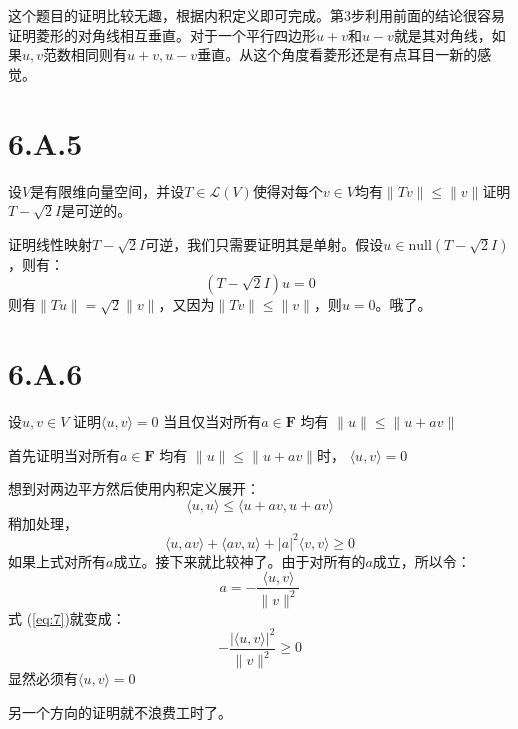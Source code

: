 \documentclass[10pt,a4paper,UTF8]{article}
\begin{document}
\begin{tikzanswer}
这个题目的证明比较无趣，根据内积定义即可完成。第3步利用前面的结论很容易证明菱形的对角线相互垂直。对于一个平行四边形\(u+v\)和\(u-v\)就是其对角线，如果\(u,v\)范数相同则有\(u+v,u-v\)垂直。从这个角度看菱形还是有点耳目一新的感觉。
\end{tikzanswer}

\section{6.A.5}
\label{sec:orga876859}


\begin{tikzproblem}
设\(V\)是有限维向量空间，并设\(T\in \mathcal{L}(V)\)使得对每个\(v\in V\)均有\(\| Tv \| \leq \| v \|\)证明\(T-\sqrt{2}I\)是可逆的。
\end{tikzproblem}

\begin{tikzanswer}
证明线性映射\(T-\sqrt{2}I\)可逆，我们只需要证明其是单射。假设\(u\in \mathrm{null}(T- \sqrt{2}I)\)，则有：
\begin{equation}
\label{eq:5}
(T-\sqrt{2}I)u = 0
\end{equation}
则有\(\| Tu \| = \sqrt{2} \| v \|\)，又因为\(\| Tv \| \leq \| v \|\)，则\(u=0\)。哦了。
\end{tikzanswer}
\section{6.A.6}
\label{sec:orgbba7a71}


\begin{tikzproblem}
设\(u,v\in V\) 证明\(\langle u,v \rangle = 0\) 当且仅当对所有\(a\in \mathbf{F}\) 均有 \(\| u \| \leq \| u + av \|\)
\end{tikzproblem}

\begin{tikzanswer}
首先证明当对所有\(a\in \mathbf{F}\) 均有 \(\| u \| \leq \| u + av \|\)时， \(\langle u,v \rangle = 0\)

想到对两边平方然后使用内积定义展开：
\begin{equation}
\label{eq:6}
\langle u,u \rangle  \leq \langle u+av,u+av \rangle
\end{equation}
稍加处理，
\begin{equation}
\label{eq:7}
\langle u,av \rangle + \langle av,u \rangle + |a|^{2} \langle v,v \rangle  \geq 0
\end{equation}
如果上式对所有\(a\)成立。接下来就比较神了。由于对所有的\(a\)成立，所以令：
\begin{equation}
\label{eq:8}
a = - \frac{ \langle u,v \rangle  }{ \| v \|^{2} }
\end{equation}
式 (\ref{eq:7})就变成：
\begin{equation}
\label{eq:9}
-\frac{  | \langle u,v \rangle |^{2}   }{ \| v \|^{2} } \geq 0
\end{equation}
显然必须有\(\langle u,v \rangle   =0\)

另一个方向的证明就不浪费工时了。
\end{tikzanswer}
\end{document}
